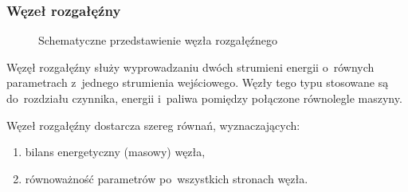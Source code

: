 \subsubsection{Węzeł rozgałęźny}

\begin{figure}[H]
	\centering


	\caption{Schematyczne przedstawienie węzła rozgałęźnego}
\end{figure}

Węzęł rozgałęźny służy wyprowadzaniu dwóch strumieni energii o~równych
parametrach z~jednego strumienia wejściowego. Węzły tego typu stosowane
są do~rozdziału czynnika, energii i~paliwa pomiędzy połączone równolegle
maszyny.

Węzeł rozgałęźny dostarcza szereg równań, wyznaczających:

\begin{enumerate}

	\item bilans energetyczny (masowy) węzła,

	\item równoważność parametrów po~wszystkich stronach węzła.

\end{enumerate}
